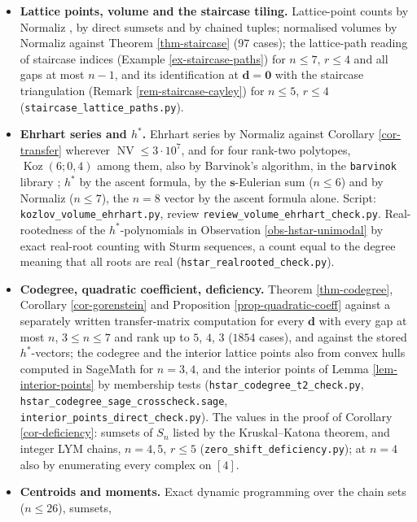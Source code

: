 \documentclass[11pt, a4paper, abstract=yes]{scrartcl}
\theoremstyle{definition}
\theoremstyle{remark}
\theoremstyle{plain}
\newcommand{\vek}[1]{\boldsymbol{#1}}
\theoremstyle{remark}
\theoremstyle{plain}
\newcommand{\Koz}{\operatorname{Koz}}
\newcommand{\NV}{\operatorname{NV}}
\begin{document}
\begin{itemize}
\item \textbf{Lattice points, volume and the staircase tiling.} Lattice-point counts by Normaliz
\autocite{BrunsIchim2010}, by direct sumsets and by chained tuples; normalised volumes by Normaliz
against Theorem \ref{thm-staircase} (\(97\) cases); the lattice-path reading of staircase indices
(Example \ref{ex-staircase-paths}) for \(n\le7\), \(r\le4\) and all gaps at most \(n-1\), and its
identification at \(\vek d=\vek 0\) with the staircase triangulation (Remark
\ref{rem-staircase-cayley}) for \(n\le5\), \(r\le4\) (\texttt{staircase\_lattice\_paths.py}).
\item \textbf{Ehrhart series and \(h^{\ast}\).} Ehrhart series by Normaliz against Corollary \ref{cor-transfer}
wherever \(\NV\le3\cdot10^7\), and for four rank-two polytopes, \(\Koz(6;0,4)\) among them, also by
Barvinok's algorithm, in the \texttt{barvinok} library \autocite{Verdoolaege2007}; \(h^*\) by the ascent
formula, by the \(\vek s\)-Eulerian sum (\(n\le6\)) and by Normaliz (\(n\le7\)), the \(n=8\) vector by
the ascent formula alone. Script: \texttt{kozlov\_volume\_ehrhart.py}, review
\texttt{review\_volume\_ehrhart\_check.py}. Real-rootedness of the \(h^*\)-polynomials in
Observation \ref{obs-hstar-unimodal} by exact real-root counting with Sturm sequences, a count equal
to the degree meaning that all roots are real (\texttt{hstar\_realrooted\_check.py}).
\item \textbf{Codegree, quadratic coefficient, deficiency.}
Theorem \ref{thm-codegree}, Corollary \ref{cor-gorenstein} and Proposition \ref{prop-quadratic-coeff} against a
separately written transfer-matrix computation for every \(\vek d\) with every gap at most \(n\),
\(3\le n\le7\) and rank up to \(5\), \(4\), \(3\) (\(1854\) cases), and against the stored \(h^*\)-vectors; the
codegree and the interior lattice points also from convex hulls computed in SageMath for \(n=3,4\),
and the interior points of Lemma \ref{lem-interior-points} by membership tests
(\texttt{hstar\_codegree\_t2\_check.py}, \texttt{hstar\_codegree\_sage\_crosscheck.sage},
\texttt{interior\_points\_direct\_check.py}). The values in the proof of Corollary \ref{cor-deficiency}: sumsets of
\(S_n\) listed by the Kruskal--Katona theorem, and integer LYM chains, \(n=4,5\), \(r\le5\)
(\texttt{zero\_shift\_deficiency.py}); at \(n=4\) also by enumerating every complex on \([4]\).
\item \textbf{Centroids and moments.} Exact dynamic programming over the chain sets (\(n\le26\)), sumsets,

\end{itemize}
\end{document}
